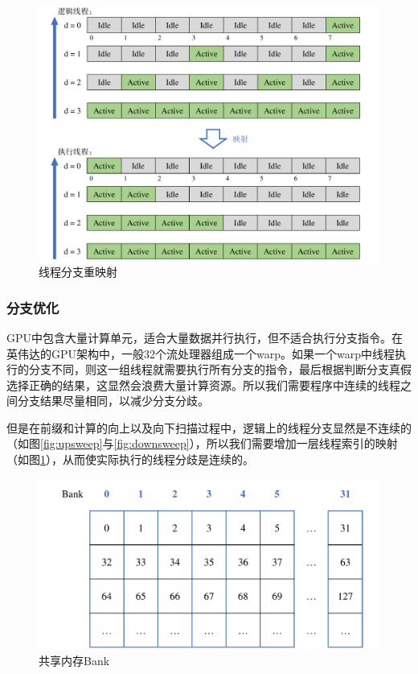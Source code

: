     \begin{figure}
    	\centering
    	\includegraphics[width=.9\textwidth]{figures/neighbor/branch_divergence.pdf}
    	\caption{线程分支重映射}
    	\label{fig:remap}
    \end{figure}

\subsubsection{分支优化}
    GPU中包含大量计算单元，适合大量数据并行执行，但不适合执行分支指令。在英伟达的GPU架构中，一般32个流处理器组成一个warp。如果一个warp中线程执行的分支不同，则这一组线程就需要执行所有分支的指令，最后根据判断分支真假选择正确的结果，这显然会浪费大量计算资源。所以我们需要程序中连续的线程之间分支结果尽量相同，以减少分支分歧。
    
    但是在前缀和计算的向上以及向下扫描过程中，逻辑上的线程分支显然是不连续的（如图\ref{fig:upsweep}与\ref{fig:downsweep}），所以我们需要增加一层线程索引的映射（如图\ref{fig:remap}），从而使实际执行的线程分歧是连续的。
    
    \begin{figure}
    	\centering
    	\includegraphics[width=.65\textwidth]{figures/neighbor/bank_conflict.pdf}
    	\caption{共享内存Bank}
    	\label{fig:bank}
    \end{figure}

